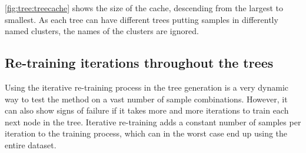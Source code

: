 \cref{fig:tree:treecache} shows the size of the cache, descending from the largest to smallest.
As each tree can have different trees putting samples in differently named clusters, the names of the clusters are ignored.

\subsection{Re-training iterations throughout the trees}
Using the iterative re-training process in the tree generation is a very dynamic way to test the method on a vast number of sample combinations.
However, it can also show signs of failure if it takes more and more iterations to train each next node in the tree.
Iterative re-training adds a constant number of samples per iteration to the training process, which can in the worst case end up using the entire dataset.

